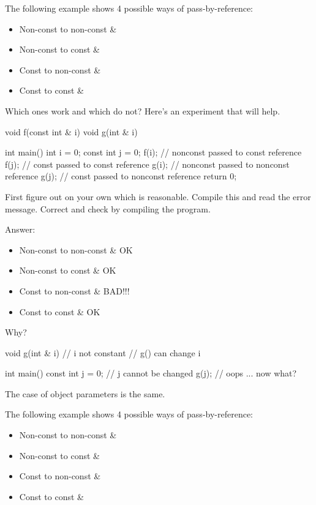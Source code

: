 The following example shows 4 possible ways of pass-by-reference:

\begin{itemize}
\item Non-const to non-const \&
\item Non-const to const \&
\item Const to non-const \&
\item Const to const \&
\end{itemize}

Which ones work and which do not? Here's an experiment
that will help.

\begin{consolethree}[escapeinside=||]
void f(const int & i) {}
void g(int & i) {}

int main()
{
    int i = 0;
    const int j = 0;
    f(i); // nonconst passed to const reference
    f(j); // const passed to const reference
    g(i); // nonconst passed to nonconst reference
    g(j); // const passed to nonconst reference
    return 0;
}
\end{consolethree}

First figure out on your own which is reasonable. Compile this and read
the error message. Correct and check by compiling the program.

Answer:

\begin{itemize}
\item Non-const to non-const \&         OK
\item Non-const to const \&             OK
\item Const to non-const \&             BAD!!!
\item Const to const \&                 OK
\end{itemize}

Why?

\begin{consolethree}[escapeinside=||]
void g(int & i) {} // i not constant
                   // g() can change i

int main()
{
    const int j = 0; // j cannot be changed
    g(j); // oops ... now what?
}
\end{consolethree}

The case of object parameters is the same.

The following example shows 4 possible ways of pass-by-reference:

\begin{itemize}
\item Non-const to non-const \&
\item Non-const to const \&
\item Const to non-const \&
\item Const to const \&
\end{itemize}


